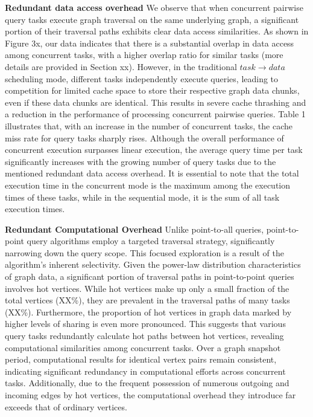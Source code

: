 \documentclass[lettersize,journal]{IEEEtran} %
\begin{document}
{\bf{Redundant data access overhead}} We observe that when concurrent pairwise query tasks execute graph traversal on the same underlying graph, a significant portion of their traversal paths exhibits clear data access similarities. As shown in Figure 3x, our data indicates that there is a substantial overlap in data access among concurrent tasks, with a higher overlap ratio for similar tasks (more details are provided in Section xx). However, in the traditional $task \rightarrow data$ scheduling mode, different tasks independently execute queries, leading to competition for limited cache space to store their respective graph data chunks, even if these data chunks are identical. This results in severe cache thrashing and a reduction in the performance of processing concurrent pairwise queries. Table 1 illustrates that, with an increase in the number of concurrent tasks, the cache miss rate for query tasks sharply rises. Although the overall performance of concurrent execution surpasses linear execution, the average query time per task significantly increases with the growing number of query tasks due to the mentioned redundant data access overhead. It is essential to note that the total execution time in the concurrent mode is the maximum among the execution times of these tasks, while in the sequential mode, it is the sum of all task execution times.


{\bf{Redundant Computational Overhead}} Unlike point-to-all queries\cite{ligra}\cite{gemini}, point-to-point query algorithms\cite{ppsp_1}\cite{ppnp}\cite{ppwp} employ a targeted traversal strategy, significantly narrowing down the query scope. This focused exploration is a result of the algorithm's inherent selectivity. Given the power-law distribution characteristics of graph data, a significant portion of traversal paths in point-to-point queries involves hot vertices. While hot vertices make up only a small fraction of the total vertices (XX\%), they are prevalent in the traversal paths of many tasks (XX\%). Furthermore, the proportion of hot vertices in graph data marked by higher levels of sharing is even more pronounced. This suggests that various query tasks redundantly calculate hot paths between hot vertices, revealing computational similarities among concurrent tasks. Over a graph snapshot period, computational results for identical vertex pairs remain consistent, indicating significant redundancy in computational efforts across concurrent tasks. Additionally, due to the frequent possession of numerous outgoing and incoming edges by hot vertices, the computational overhead they introduce far exceeds that of ordinary vertices.
\end{document}
